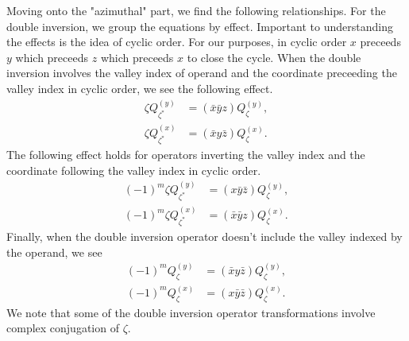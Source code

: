 Moving onto the "azimuthal" part, we find the following relationships. For the
double inversion, we group the equations by effect. Important to understanding
the effects is the idea of cyclic order. For our purposes, in cyclic order $x$
preceeds $y$ which preceeds $z$ which preceeds $x$ to close the cycle. When the
double inversion involves the valley index of operand and the coordinate
preceeding the valley index in cyclic order, we see the following effect.
\begin{align}
  \zeta Q_{\zeta^{*}}^{\left(y\right)}
  & =
    \left(\bar{x}\bar{y}z\right)
    Q_{\zeta}^{\left(y\right)},
  \\
  \zeta Q_{\zeta^{*}}^{\left(x\right)}
  & =
    \left(\bar{x}y\bar{z}\right)
    Q_{\zeta}^{\left(x\right)}.
\end{align}
The following effect holds for operators inverting the valley index and the
coordinate following the valley index in cyclic order.
\begin{align}
  \left(-1\right)^{m}\zeta Q_{\zeta^{*}}^{\left(y\right)}
  & =
    \left(x\bar{y}\bar{z}\right)
    Q_{\zeta}^{\left(y\right)},
  \\
  \left(-1\right)^{m}\zeta Q_{\zeta^{*}}^{\left(x\right)}
  & =
    \left(\bar{x}\bar{y}z\right)
    Q_{\zeta}^{\left(x\right)}.
\end{align}
Finally, when the double inversion operator doesn't include the valley indexed
by the operand, we see
\begin{align}
  \left(-1\right)^{m}Q_{\zeta}^{\left(y\right)}
  & =
    \left(\bar{x}y\bar{z}\right)
    Q_{\zeta}^{\left(y\right)},
  \\
  \left(-1\right)^{m}Q_{\zeta}^{\left(x\right)}
  & =
    \left(x\bar{y}\bar{z}\right)
    Q_{\zeta}^{\left(x\right)}.
\end{align}
We note that some of the double inversion operator transformations involve
complex conjugation of $\zeta$.

